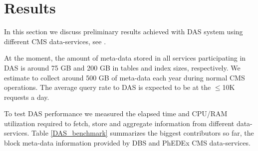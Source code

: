 \documentclass[1p,times]{elsarticle}
\begin{document}
\section{Results\label{Results}}
In this section we discuss preliminary results achieved with DAS system
using different CMS data-services, see \cite{CMS, CMSDataModel}.



At the moment, the amount of meta-data stored in all services participating
in DAS is around
75 GB and 200 GB in tables and index sizes, respectively. We estimate to
collect around 500 GB of meta-data each year during 
normal CMS operations. The average query rate to DAS is expected to be at the 
$\leq$10K requests a day.

To test DAS performance we measured the elapsed time and CPU/RAM utilization
required to fetch, store and aggregate information from different
data-services. Table \ref{DAS_benchmark} summarizes the biggest 
contributors so far, the block meta-data information provided by DBS and 
PhEDEx CMS data-services. 
\end{document}
